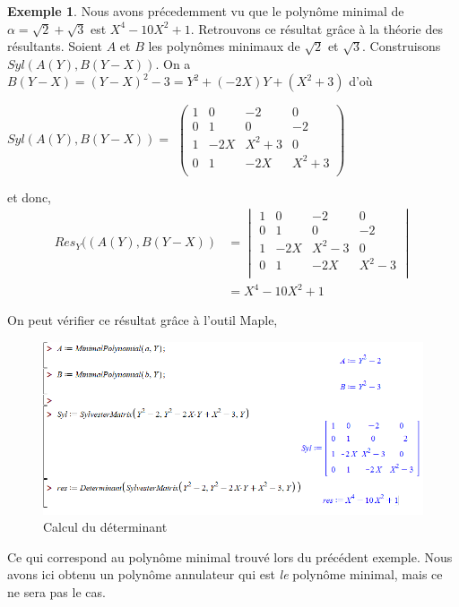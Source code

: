 \documentclass[12pt]{article}
\theoremstyle{definition}\newtheorem{defn}{Définition}
\theoremstyle{definition}\newtheorem{exm}{Exemple}
\theoremstyle{definition}\newtheorem{rem}{Remarque}
\theoremstyle{definition}\newtheorem{algo}{Algorithme}
\theoremstyle{remark}\newtheorem{exo}{Exercice}
\theoremstyle{remark}\newtheorem{nota}{Notation}
\begin{document}
\begin{exm}
Nous avons précedemment vu que le polynôme minimal de $\alpha = \sqrt2 + \sqrt3$ est $X^4 -10X^2 +1$. Retrouvons ce résultat grâce à la théorie des résultants. Soient $A$ et $B$ les polynômes minimaux de $\sqrt2$ et $\sqrt3$. Construisons $Syl(A(Y), B(Y-X))$. On a $B(Y-X) = (Y-X)^2 -3 = Y^2 + (-2X)Y + (X^2+3)$ d'où

\begin{center}
$Syl(A(Y), B(Y-X)) =$
$
   \begin{pmatrix} 
1 & 0 & -2 & 0 \\
0 & 1 & 0 & -2 \\
1 & -2X & X^2 +3 & 0 \\
0 & 1 & -2X & X^2 +3 \\
   \end{pmatrix} 
$
\end{center}

et donc,
			\begin{align*} 
Res_Y((A(Y), B(Y-X))&= \begin{vmatrix} 1 & 0 & -2 & 0 \\ 0 & 1 & 0 & -2 \\ 1 & -2X & X^2 - 3 & 0 \\ 0 & 1 & -2X & X^2 -3 \\\end{vmatrix}  \\
&= X^4 -10X^2 +1 
			\end{align*} 
\pagebreak

On peut vérifier ce résultat grâce à l'outil Maple,
\begin{figure}[h]
\includegraphics[scale=0.75]{code1.png}
\caption{Calcul du déterminant}
\end{figure}

Ce qui correspond au polynôme minimal trouvé lors du précédent exemple. Nous avons ici obtenu un polynôme annulateur qui est \textit{le} polynôme minimal, mais ce ne sera pas  le cas.
\end{exm}
\end{document}
